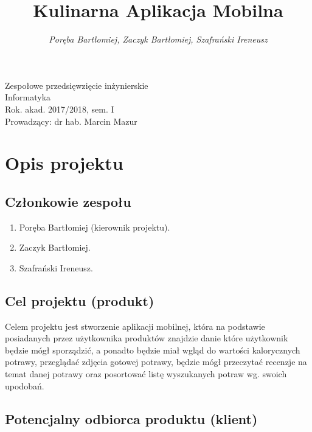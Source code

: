 \documentclass[a4paper]{article}
\title{\bf{Kulinarna Aplikacja Mobilna}}
\author{{\em Poręba Bartłomiej, Zaczyk Bartłomiej, Szafrański Ireneusz}}
\date{}
\begin{document}
\begin{titlepage}
\maketitle
\thispagestyle{empty}
\bigskip
\begin{center}
Zespołowe przedsięwzięcie inżynierskie\\[2mm]

Informatyka\\[2mm]

Rok. akad. 2017/2018, sem. I\\[2mm]

Prowadzący: dr hab. Marcin Mazur
\end{center}
\end{titlepage}

\tableofcontents
\thispagestyle{empty}

\newpage

\section{Opis projektu}

\subsection{Członkowie zespołu}

\begin{enumerate}
\item Poręba Bartłomiej (kierownik projektu).
\item Zaczyk Bartłomiej.
\item Szafrański Ireneusz.
\end{enumerate}

\subsection{Cel projektu (produkt)}

Celem projektu jest stworzenie aplikacji mobilnej, która na podstawie posiadanych przez użytkownika produktów znajdzie danie które użytkownik będzie mógł sporządzić, a ponadto będzie miał wgląd do wartości kalorycznych potrawy, przeglądać zdjęcia gotowej potrawy, będzie mógł przeczytać recenzje na temat danej potrawy oraz posortować listę wyszukanych potraw wg. swoich upodobań.

\subsection{Potencjalny odbiorca produktu (klient)}
\end{document}
